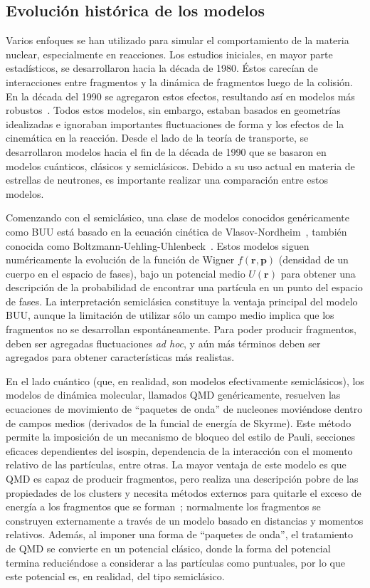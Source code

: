 \subsection{Evolución histórica de los modelos}
Varios enfoques se han utilizado para simular el comportamiento de la materia nuclear, especialmente en reacciones.
Los estudios iniciales, en mayor parte estadísticos, se desarrollaron hacia la década de 1980.
Éstos carecían de interacciones entre fragmentos y la dinámica de fragmentos luego de la colisión.
En la década del 1990 se agregaron estos efectos, resultando así en modelos más robustos~\cite{barz_cluster_1996}.
Todos estos modelos, sin embargo, estaban basados en geometrías idealizadas e ignoraban importantes fluctuaciones de forma y los efectos de la cinemática en la reacción.
Desde el lado de la teoría de transporte, se desarrollaron modelos hacia el fin de la década de 1990 que se basaron en modelos cuánticos, clásicos y semiclásicos.
Debido a su uso actual en materia de estrellas de neutrones, es importante realizar una comparación entre estos modelos.

Comenzando con el semiclásico, una clase de modelos conocidos genéricamente como BUU está basado en la ecuación cinética de Vlasov-Nordheim~\cite{nordheim_kinetic_1928}, también conocida como Boltzmann-Uehling-Uhlenbeck~\cite{uehling_transport_1933}.
Estos modelos siguen numéricamente la evolución de la función de Wigner $f(\mathbf{r},\mathbf{p})$ (densidad de un cuerpo en el espacio de fases), bajo un potencial medio $U(\mathbf{r})$ para obtener una descripción de la probabilidad de encontrar una partícula en un punto del espacio de fases.
La interpretación semiclásica constituye la ventaja principal del modelo BUU, aunque la limitación de utilizar sólo un campo medio implica que los fragmentos no se desarrollan espontáneamente.
Para poder producir fragmentos, deben ser agregadas fluctuaciones \emph{ad hoc}, y aún más términos deben ser agregados para obtener características más realistas.

En el lado cuántico (que, en realidad, son modelos efectivamente semiclásicos), los modelos de dinámica molecular, llamados QMD genéricamente, resuelven las ecuaciones de movimiento de ``paquetes de onda'' de nucleones moviéndose dentro de campos medios (derivados de la funcial de energía de Skyrme).
Este método permite la imposición de un mecanismo de bloqueo del estilo de Pauli, secciones eficaces dependientes del isospin, dependencia de la interacción con el momento relativo de las partículas, entre otras.
La mayor ventaja de este modelo es que QMD es capaz de producir fragmentos, pero realiza una descripción pobre de las propiedades de los clusters y necesita métodos externos para quitarle el exceso de energía a los fragmentos que se forman~\cite{polanski_development_2005};
normalmente los fragmentos se construyen externamente a través de un modelo basado en distancias y momentos relativos.
Además, al imponer una forma de ``paquetes de onda'', el tratamiento de QMD se convierte en un potencial clásico, donde la forma del potencial termina reduciéndose a considerar a las partículas como puntuales, por lo que este potencial es, en realidad, del tipo semiclásico.


